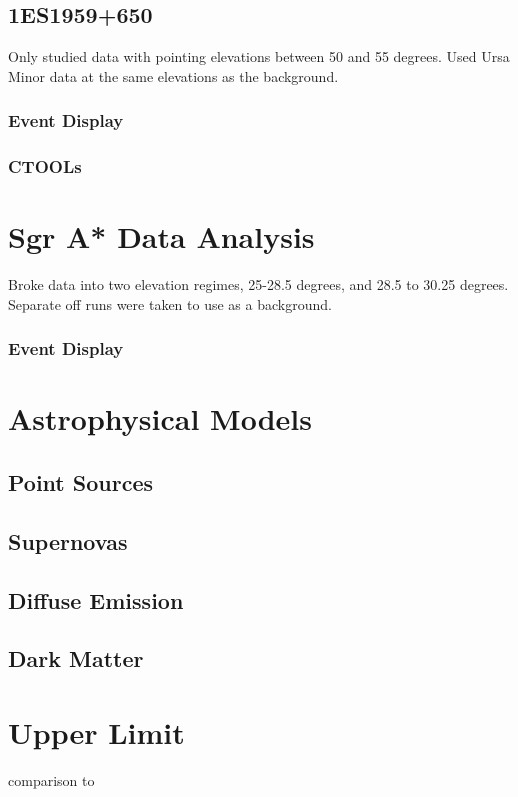   \subsection{1ES1959+650}
    Only studied data with pointing elevations between 50 and 55 degrees.
    Used Ursa Minor data at the same elevations as the background.

    \subsubsection{Event Display}
    \subsubsection{CTOOLs}

\section{Sgr A* Data Analysis}
Broke data into two elevation regimes, 25-28.5 degrees, and 28.5 to 30.25 degrees.
Separate off runs were taken to use as a background.

  \subsubsection{Event Display}

\section{Astrophysical Models}

\subsection{Point Sources}

\subsection{Supernovas}

\subsection{Diffuse Emission}

\subsection{Dark Matter}

\section{Upper Limit}

comparison to 

